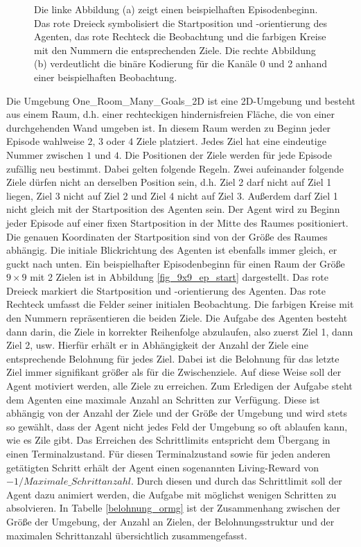 \begin{figure}[ht!]
\begin{subfigure}[c]{0.6\textwidth}
    \subcaption{}
    \label{fig_9x9_sample_obs}
  \end{subfigure}
  \caption{Die linke Abbildung (a) zeigt einen beispielhaften Episodenbeginn. Das rote Dreieck symbolisiert die Startposition und -orientierung des Agenten, das rote Rechteck die Beobachtung und die farbigen Kreise mit den Nummern die entsprechenden Ziele. Die rechte Abbildung (b) verdeutlicht die binäre Kodierung für die Kanäle 0 und 2 anhand einer beispielhaften Beobachtung.}
\end{figure}


Die Umgebung \glqq One\_Room\_Many\_Goals\_2D\grqq{} ist eine 2D-Umgebung und besteht aus einem Raum, d.h. einer rechteckigen hindernisfreien Fläche, die von einer durchgehenden Wand umgeben ist. In diesem Raum werden zu Beginn jeder Episode wahlweise $2$, $3$ oder $4$ Ziele platziert. Jedes Ziel hat eine eindeutige Nummer zwischen $1$ und $4$. Die Positionen der Ziele werden für jede Episode zufällig neu bestimmt. Dabei gelten folgende Regeln. Zwei aufeinander folgende Ziele dürfen nicht an derselben Position sein, d.h. Ziel 2 darf nicht auf Ziel 1 liegen, Ziel 3 nicht auf Ziel 2 und Ziel 4 nicht auf Ziel 3. Außerdem darf Ziel 1 nicht gleich mit der Startposition des Agenten sein. Der Agent wird zu Beginn jeder Episode auf einer fixen Startposition in der Mitte des Raumes positioniert. Die genauen Koordinaten der Startposition sind von der Größe des Raumes abhängig. Die initiale Blickrichtung des Agenten ist ebenfalls immer gleich, er guckt nach unten. Ein beispielhafter Episodenbeginn für einen Raum der Größe $9 \times 9$ mit 2 Zielen ist in Abbildung \ref{fig_9x9_ep_start} dargestellt. Das rote Dreieck markiert die Startposition und -orientierung des Agenten. Das rote Rechteck umfasst die Felder seiner initialen Beobachtung. Die farbigen Kreise mit den Nummern repräsentieren die beiden Ziele. Die Aufgabe des Agenten besteht dann darin, die Ziele in korrekter Reihenfolge abzulaufen, also zuerst Ziel 1, dann Ziel 2, usw. Hierfür erhält er in Abhängigkeit der Anzahl der Ziele eine entsprechende Belohnung für jedes Ziel. Dabei ist die Belohnung für das letzte Ziel immer signifikant größer als für die Zwischenziele. Auf diese Weise soll der Agent motiviert werden, alle Ziele zu erreichen. Zum Erledigen der Aufgabe steht dem Agenten eine maximale Anzahl an Schritten zur Verfügung. Diese ist abhängig von der Anzahl der Ziele und der Größe der Umgebung und wird stets so gewählt, dass der Agent nicht jedes Feld der Umgebung so oft ablaufen kann, wie es Zile gibt. Das Erreichen des Schrittlimits entspricht dem Übergang in einen Terminalzustand. Für diesen Terminalzustand sowie für jeden anderen getätigten Schritt erhält der Agent einen sogenannten Living-Reward von $-1 / Maximale\_Schrittanzahl$. Durch diesen und durch das Schrittlimit soll der Agent dazu animiert werden, die Aufgabe mit möglichst wenigen Schritten zu absolvieren. In Tabelle \ref{belohnung_ormg} ist der Zusammenhang zwischen der Größe der Umgebung, der Anzahl an Zielen, der Belohnungsstruktur und der maximalen Schrittanzahl übersichtlich zusammengefasst.

